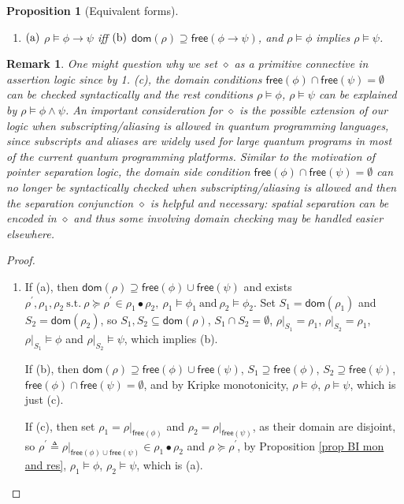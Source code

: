 \documentclass[conference,compsoc, 10pt]{IEEEtran}
\newtheorem{remark}{Remark}[section]
\newtheorem{proposition}{Proposition}[section]
\newcommand {\Ldom }[1] {{\mathsf{dom}\!\left(#1\right)}}
\newcommand {\Lfree }[1] {{\mathsf{free}{\left(#1\right)}}}
\newcommand {\rt }[2] {{\left.{#1}\right|_{#2}}}
\newcommand{\sd}{\diamond}%
\begin{document}
\begin{appendices}
\begin{proposition}[Equivalent forms]
\begin{enumerate}
				\item[${\rm 5.}$] ${\rm (a)}$ $\rho\models\phi\rightarrow\psi$ iff
				${\rm (b)}$ $\Ldom{\rho} \supseteq \Lfree{\phi\rightarrow\psi}$, and $\rho\models\phi$ implies $\rho\models\psi$.
			\end{enumerate}
		\end{proposition}
		\begin{remark}
			One might question why we set $\sd$ as a primitive connective in assertion logic since by 1. (c), the domain conditions $\Lfree{\phi}\cap\Lfree{\psi} = \emptyset$ can be checked syntactically and the rest conditions $\rho\models\phi$, $\rho\models\psi$ can be explained by $\rho\models\phi\wedge\psi$. An important consideration for $\sd$ is the possible extension of our logic when subscripting/aliasing is allowed in quantum programming languages, since subscripts and aliases are widely used for large quantum programs in most of the current quantum programming platforms. Similar to the motivation of pointer separation logic, the domain side condition $\Lfree{\phi}\cap\Lfree{\psi} = \emptyset$ can no longer be syntactically checked when subscripting/aliasing is allowed and then the separation conjunction $\sd$ is helpful and necessary: spatial separation can be encoded in $\sd$ and thus some involving domain checking may be handled easier elsewhere.
		\end{remark}
		\begin{proof}
			\begin{enumerate}
				\item[${\rm 1.}$] If (a), then $\Ldom{\rho}\supseteq \Lfree{\phi}\cup\Lfree{\psi}$ and exists 
				$\rho^\prime,\rho_1,\rho_2\ \text{s.t.}\ \rho\succeq \rho^\prime\in \rho_1\bullet \rho_2,\ \rho_1\models \phi_1\ \text{and}\ \rho_2\models\phi_2$. Set $S_1=\Ldom{\rho_1}$ and $S_2=\Ldom{\rho_2}$, so $S_1,S_2\subseteq\Ldom{\rho}$, $S_1\cap S_2 = \emptyset$, $\rt{\rho}{S_1} = \rho_1$, $\rt{\rho}{S_2} = \rho_1$, $\rt{\rho}{S_1}\models\phi$ and $\rt{\rho}{S_2}\models\psi$, which implies (b).
				
				If (b), then $\Ldom{\rho}\supseteq \Lfree{\phi}\cup\Lfree{\psi}$, $S_1\supseteq\Lfree{\phi}$, $S_2\supseteq\Lfree{\psi}$, $\Lfree{\phi}\cap\Lfree{\psi} = \emptyset$, and by Kripke monotonicity, $\rho\models\phi$, $\rho\models\psi$, which is just (c).
				
				If (c), then set $\rho_1 = \rt{\rho}{\Lfree{\phi}}$ and $\rho_2 = \rt{\rho}{\Lfree{\psi}}$, as their domain are disjoint, so $\rho^\prime \triangleq \rt{\rho}{\Lfree{\phi}\cup\Lfree{\psi}}\in\rho_1\bullet\rho_2$ and $\rho\succeq\rho^\prime$, by Proposition \ref{prop BI mon and res}, $\rho_1\models\phi$, $\rho_2\models\psi$, which is (a).
				

\end{enumerate}
\end{proof}
\end{appendices}
\end{document}
